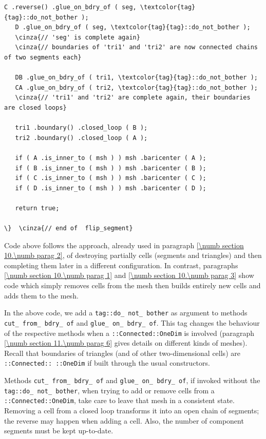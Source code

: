 \begin{Verbatim}[commandchars=\\\{\},formatcom=\small\tt,frame=single,
   label=parag-\ref{\numb section 10.\numb parag 3}.cpp,rulecolor=\color{coment},
   baselinestretch=0.94,framesep=2mm]
   C .reverse() .glue_on_bdry_of ( seg, \textcolor{tag}{tag}::do_not_bother );
   D .glue_on_bdry_of ( seg, \textcolor{tag}{tag}::do_not_bother );
   \cinza{// 'seg' is complete again}
   \cinza{// boundaries of 'tri1' and 'tri2' are now connected chains of two segments each}
   
   DB .glue_on_bdry_of ( tri1, \textcolor{tag}{tag}::do_not_bother );
   CA .glue_on_bdry_of ( tri2, \textcolor{tag}{tag}::do_not_bother );
   \cinza{// 'tri1' and 'tri2' are complete again, their boundaries are closed loops}

   tri1 .boundary() .closed_loop ( B );
   tri2 .boundary() .closed_loop ( A );

   if ( A .is_inner_to ( msh ) ) msh .baricenter ( A );
   if ( B .is_inner_to ( msh ) ) msh .baricenter ( B );
   if ( C .is_inner_to ( msh ) ) msh .baricenter ( C );
   if ( D .is_inner_to ( msh ) ) msh .baricenter ( D );

   return true;

\}  \cinza{// end of  flip_segment}
\end{Verbatim}

Code above follows the approach, already used in paragraph \ref{\numb section 10.\numb parag 2},
of destroying partially cells (segments and triangles) and then completing them later
in a different configuration.
In contrast, paragraphs \ref{\numb section 10.\numb parag 1} and
\ref{\numb section 10.\numb parag 3} show code which simply removes cells from the mesh
then builds entirely new cells and adds them to the mesh.

In the above code, we add a {\small\tt\textcolor{tag}{tag}::do\_\,not\_\,bother} as argument
to methods {\small\tt cut\_\,from\_\,bdry\_\,of} and {\small\tt glue\_\,on\_\,bdry\_\,of}.
This tag changes the behaviour of the respective methods when a
{\small\tt{}::Connected::OneDim} is involved
(paragraph \ref{\numb section 11.\numb parag 6} gives details on different kinds of meshes).
Recall that boundaries of triangles (and of other two-dimensional cells) are
{\small\tt{}::Connected:: ::OneDim} if built through the usual constructors.

Methods {\small\tt cut\_\,from\_\,bdry\_\,of} and {\small\tt glue\_\,on\_\,bdry\_\,of},
if invoked without the {\small\tt\textcolor{tag}{tag}::do\_\,not\_\,bother},
when trying to add or remove cells from a {\small\tt{}::Connected::OneDim},
take care to leave that mesh in a consistent state.
Removing a cell from a closed loop transforms it into an open chain of segments;
the reverse may happen when adding a cell.
Also, the number of component segments must be kept up-to-date.

